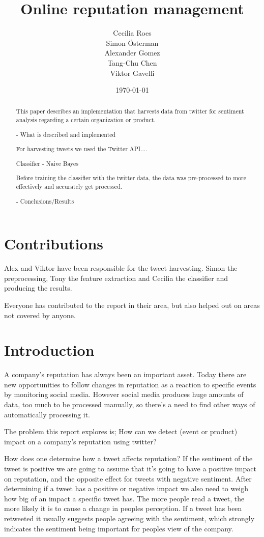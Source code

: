 \documentclass[a4paper]{article}
\title{Online reputation management}
\date{\today}
\author{Cecilia Roes \\ Simon Österman \\ Alexander Gomez \\ Tang-Chu Chen \\ Viktor Gavelli}
\begin{document}
\maketitle
\begin{abstract}
This paper describes an implementation that harvests data from twitter for sentiment analysis regarding a certain organization or product. 

- What is described and implemented 

For harvesting tweets we used the Twitter API....

Classifier - Naive Bayes

Before training the classifier with the twitter data, the data was pre-processed to more effectively and accurately get processed. 

- Conclusions/Results

\end{abstract}
\newpage
\tableofcontents
\section*{Contributions}
Alex and Viktor have been responsible for the tweet harvesting.
Simon the preprocessing, Tony the feature extraction and Cecilia the classifier and producing the results.

Everyone has contributed to the report in their area, but also helped out on areas not covered by anyone.
\newpage
\section{Introduction}
A company’s reputation has always been an important asset. Today there are new opportunities to follow changes in reputation as a reaction to specific events by monitoring social media. However social media produces huge amounts of data, too much to be processed manually, so there’s a need to find other ways of automatically processing it.

The problem this report explores is; How can we detect (event or product) impact on a company’s reputation using twitter?

How does one determine how a tweet affects reputation? If the sentiment of the tweet is positive we are going to assume that it’s going to have a positive impact on reputation, and the opposite effect for tweets with negative sentiment. After determining if a tweet has a positive or negative impact we also need to weigh how big of an impact a specific tweet has. The more people read a tweet, the more likely it is to cause a change in peoples perception. If a tweet has been retweeted it usually suggests people agreeing with the sentiment, which strongly indicates the sentiment being important for peoples view of the company.
\end{document}
